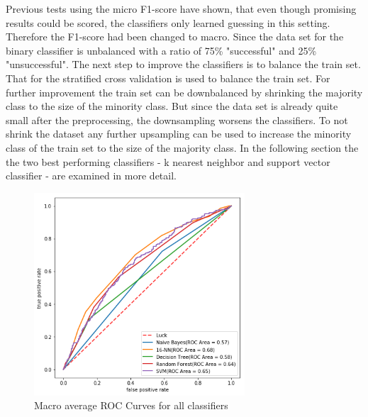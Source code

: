 Previous tests using the micro F1-score have shown, that even though promising results could be scored, the classifiers only learned guessing in this setting. Therefore the F1-score had been changed to macro.
 Since the data set for the binary classifier is unbalanced with a ratio of 75\% "successful" and 25\% "unsuccessful". The next step to improve the classifiers is to balance the train set. That for the stratified cross validation is used to balance the train set. For further improvement the train set can be downbalanced by shrinking the majority class to the size of the minority class. But since the data set is already quite small after the preprocessing, the downsampling worsens the classifiers. To not shrink the dataset any further upsampling can be used to increase the minority class of the train set to the size of the majority class. In the following section the the two best performing classifiers - k nearest neighbor and support vector classifier - are examined in more detail.
\begin{figure}[h]
	\center
	\includegraphics[width=0.7\textwidth]{images/roc.png}
	\caption{Macro average ROC Curves for all classifiers}
	\label{img:roc}
\end{figure}
 
